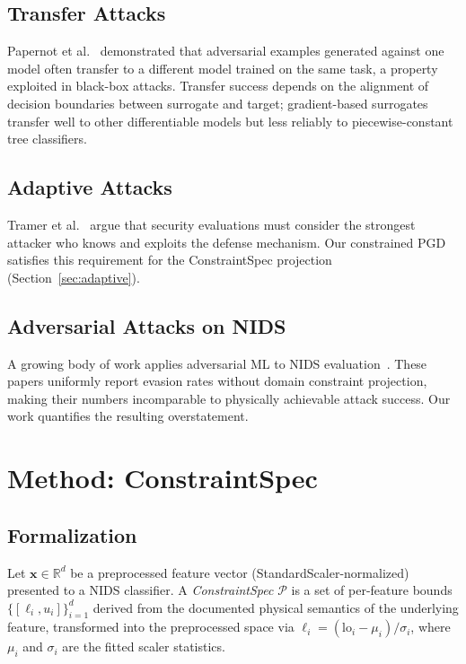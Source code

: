\documentclass[sigconf,anonymous=true]{acmart}
\begin{document}
\subsection{Transfer Attacks}

Papernot et al.~\cite{papernot2017practical} demonstrated that
adversarial examples generated against one model often transfer to a
different model trained on the same task, a property exploited in
black-box attacks.  Transfer success depends on the alignment of
decision boundaries between surrogate and target; gradient-based
surrogates transfer well to other differentiable models but less
reliably to piecewise-constant tree classifiers.

\subsection{Adaptive Attacks}

Tramer et al.~\cite{tramer2020adaptive} argue that security evaluations
must consider the strongest attacker who knows and exploits the
defense mechanism.  Our constrained PGD satisfies this requirement
for the ConstraintSpec projection (Section~\ref{sec:adaptive}).

\subsection{Adversarial Attacks on NIDS}

A growing body of work applies adversarial ML to NIDS
evaluation~\cite{han2021evaluating, yang2022carefully, lin2022idsgan,
debicha2023adv}.  These papers uniformly report evasion rates without
domain constraint projection, making their numbers incomparable to
physically achievable attack success.  Our work quantifies the resulting
overstatement.

\section{Method: ConstraintSpec}
\label{sec:method}

\subsection{Formalization}

Let $\mathbf{x} \in \mathbb{R}^d$ be a preprocessed feature vector
(StandardScaler-normalized) presented to a NIDS classifier.  A
\emph{ConstraintSpec} $\mathcal{P}$ is a set of per-feature bounds
$\{[\ell_i, u_i]\}_{i=1}^{d}$ derived from the documented physical
semantics of the underlying feature, transformed into the preprocessed
space via $\ell_i = (\text{lo}_i - \mu_i)/\sigma_i$, where $\mu_i$ and
$\sigma_i$ are the fitted scaler statistics.
\end{document}
